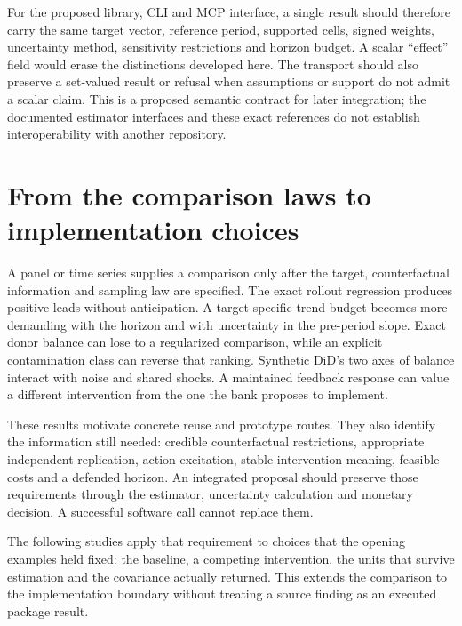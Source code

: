 For the proposed library, CLI and MCP interface, a single result should
therefore carry the same target vector, reference period, supported
cells, signed weights, uncertainty method, sensitivity restrictions
and horizon budget. A scalar ``effect'' field would erase the
distinctions developed here. The transport should also preserve a
set-valued result or refusal when assumptions or support do not
admit a scalar claim. This is a proposed semantic contract for later
integration; the documented estimator interfaces and these exact
references do not establish interoperability with another repository.



\section{From the comparison laws to implementation choices}
\label{exec17:s6-end}

A panel or time series supplies a comparison only after the target,
counterfactual information and sampling law are specified. The exact
rollout regression produces positive leads without anticipation.
A target-specific trend budget becomes more demanding with the
horizon and with uncertainty in the pre-period slope. Exact donor
balance can lose to a regularized comparison, while an explicit
contamination class can reverse that ranking. Synthetic DiD's two
axes of balance interact with noise and shared shocks. A maintained
feedback response can value a different intervention from the one
the bank proposes to implement.

These results motivate concrete reuse and prototype routes. They
also identify the information still needed: credible counterfactual
restrictions, appropriate independent replication, action excitation,
stable intervention meaning, feasible costs and a defended horizon.
An integrated proposal should preserve those requirements through
the estimator, uncertainty calculation and monetary decision. A
successful software call cannot replace them.

The following studies apply that requirement to choices that the opening
examples held fixed: the baseline, a competing intervention, the units that
survive estimation and the covariance actually returned. This extends the
comparison to the implementation boundary without treating a source finding
as an executed package result.
